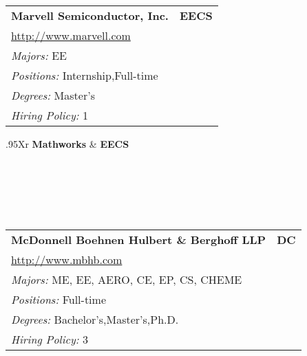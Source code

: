\documentclass[twoside]{article}
\begin{document}
\begin{center}
\begin{multicols}{3}
\begin{FlushLeft}
\begin{minipage}{\columnwidth}
\end{minipage}
 
\begin{minipage}{\columnwidth}\begin{tabularx}{.95\columnwidth}{Xr}
                 {\Large\bf Marvell Semiconductor, Inc.} & {\Large\bf EECS}\\
    \multicolumn{2}{p{.95\columnwidth}}{\url{http://www.marvell.com}}\\
    \multicolumn{2}{p{.95\columnwidth}}{\emph{Majors:} EE}\\
    \multicolumn{2}{p{.95\columnwidth}}{\emph{Positions:} Internship,Full-time}\\
    \multicolumn{2}{p{.95\columnwidth}}{\emph{Degrees:} Master's}\\
    \multicolumn{2}{p{.95\columnwidth}}{\emph{Hiring Policy:} 1}\\
    \end{tabularx}
    
\end{minipage}
 
\begin{minipage}{\columnwidth}\begin{tabularx}{.95\columnwidth}{Xr}
                 {\Large\bf Mathworks} & {\Large\bf EECS}\\
    \\
    \\
    \\
    \\
    \\
    \end{tabularx}
    
\end{minipage}
 
\begin{minipage}{\columnwidth}\begin{tabularx}{.95\columnwidth}{Xr}
                 {\Large\bf McDonnell Boehnen Hulbert \& Berghoff LLP} & {\Large\bf DC}\\
    \multicolumn{2}{p{.95\columnwidth}}{\url{http://www.mbhb.com}}\\
    \multicolumn{2}{p{.95\columnwidth}}{\emph{Majors:} ME, EE, AERO, CE, EP, CS, CHEME}\\
    \multicolumn{2}{p{.95\columnwidth}}{\emph{Positions:} Full-time}\\
    \multicolumn{2}{p{.95\columnwidth}}{\emph{Degrees:} Bachelor's,Master's,Ph.D.}\\
    \multicolumn{2}{p{.95\columnwidth}}{\emph{Hiring Policy:} 3}\\
    \end{tabularx}
    

\end{minipage}
\end{FlushLeft}
\end{multicols}
\end{center}
\end{document}
